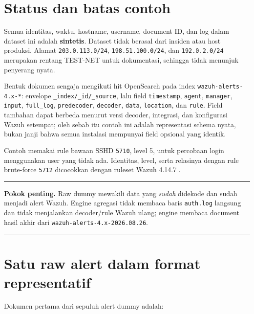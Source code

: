 \documentclass[11pt,a4paper,oneside]{report}
\DeclareRobustCommand{\code}[1]{\nolinkurl{#1}}
\newenvironment{keypoint}
  {\begin{center}\begin{minipage}{0.92\textwidth}\color{WazuhDark}\hrule\vspace{7pt}\textbf{Pokok penting.} }
  {\vspace{7pt}\hrule\end{minipage}\end{center}}
\begin{document}
\section{Status dan batas contoh}

Semua identitas, waktu, hostname, username, document ID, dan log dalam dataset ini
adalah \textbf{sintetis}. Dataset tidak berasal dari insiden atau host produksi.
Alamat \code{203.0.113.0/24}, \code{198.51.100.0/24}, dan
\code{192.0.2.0/24} merupakan rentang TEST-NET untuk dokumentasi, sehingga tidak
menunjuk penyerang nyata.

Bentuk dokumen sengaja mengikuti hit OpenSearch pada index
\code{wazuh-alerts-4.x-*}: envelope \code{_index/_id/_source}, lalu field
\code{timestamp}, \code{agent}, \code{manager}, \code{input},
\code{full_log}, \code{predecoder}, \code{decoder}, \code{data},
\code{location}, dan \code{rule}. Field tambahan dapat berbeda menurut versi
decoder, integrasi, dan konfigurasi Wazuh setempat; oleh sebab itu contoh ini
adalah representasi schema nyata, bukan janji bahwa semua instalasi mempunyai
field opsional yang identik.

Contoh memakai rule bawaan SSHD \code{5710}, level 5, untuk percobaan login
menggunakan user yang tidak ada. Identitas, level, serta relasinya dengan rule
brute-force \code{5712} dicocokkan dengan ruleset Wazuh 4.14.7
\cite{wazuhsshrules}.

\begin{keypoint}
Raw dummy mewakili data yang \emph{sudah} didekode dan sudah menjadi alert Wazuh.
Engine agregasi tidak membaca baris \code{auth.log} langsung dan tidak menjalankan
decoder/rule Wazuh ulang; engine membaca document hasil akhir dari
\code{wazuh-alerts-4.x-2026.08.26}.
\end{keypoint}

\section{Satu raw alert dalam format representatif}

Dokumen pertama dari sepuluh alert dummy adalah:
\end{document}
